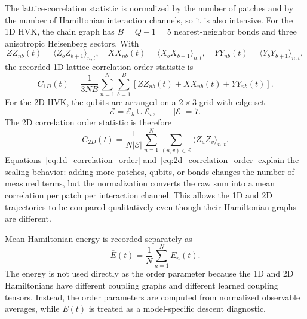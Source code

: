 \documentclass[11pt]{article}
\begin{document}
The lattice-correlation statistic is normalized by the number of patches and by the number of Hamiltonian interaction channels, so it is also intensive. For the 1D HVK, the chain graph has $B=Q-1=5$ nearest-neighbor bonds and three anisotropic Heisenberg sectors. With
\begin{equation}
ZZ_{nb}(t)=\langle Z_bZ_{b+1}\rangle_{n,t},
\quad
XX_{nb}(t)=\langle X_bX_{b+1}\rangle_{n,t},
\quad
YY_{nb}(t)=\langle Y_bY_{b+1}\rangle_{n,t},
\end{equation}
the recorded 1D lattice-correlation order statistic is
\begin{equation}
C_{1D}(t)
=
\frac{1}{3NB}
\sum_{n=1}^{N}
\sum_{b=1}^{B}
\left[
ZZ_{nb}(t)+XX_{nb}(t)+YY_{nb}(t)
\right].
\label{eq:1d_correlation_order}
\end{equation}
For the 2D HVK, the qubits are arranged on a $2\times3$ grid with edge set
\begin{equation}
\mathcal{E}
=
\mathcal{E}_h\cup\mathcal{E}_v,
\qquad
|\mathcal{E}|=7.
\end{equation}
The 2D correlation order statistic is therefore
\begin{equation}
C_{2D}(t)
=
\frac{1}{N|\mathcal{E}|}
\sum_{n=1}^{N}
\sum_{(u,v)\in\mathcal{E}}
\langle Z_uZ_v\rangle_{n,t}.
\label{eq:2d_correlation_order}
\end{equation}
Equations~\eqref{eq:1d_correlation_order} and~\eqref{eq:2d_correlation_order} explain the scaling behavior: adding more patches, qubits, or bonds changes the number of measured terms, but the normalization converts the raw sum into a mean correlation per patch per interaction channel. This allows the 1D and 2D trajectories to be compared qualitatively even though their Hamiltonian graphs are different.

Mean Hamiltonian energy is recorded separately as
\begin{equation}
\overline{E}(t)
=
\frac{1}{N}
\sum_{n=1}^{N}E_n(t).
\end{equation}
The energy is not used directly as the order parameter because the 1D and 2D Hamiltonians have different coupling graphs and different learned coupling tensors. Instead, the order parameters are computed from normalized observable averages, while $\overline{E}(t)$ is treated as a model-specific descent diagnostic.
\end{document}
